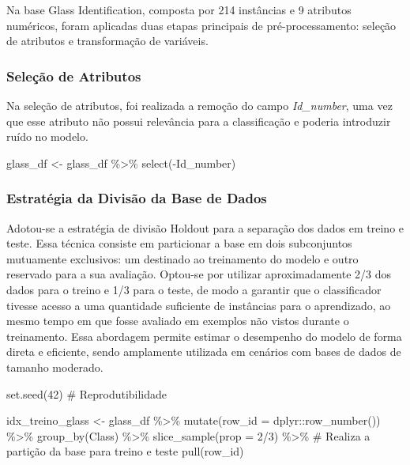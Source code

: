 \documentclass[
  letterpaper,
  DIV=11,
  numbers=noendperiod]{scrartcl}
\newenvironment{Shaded}{\begin{snugshade}}{\end{snugshade}}
\newcommand{\AttributeTok}[1]{\textcolor[rgb]{0.40,0.45,0.13}{#1}}
\newcommand{\CommentTok}[1]{\textcolor[rgb]{0.37,0.37,0.37}{#1}}
\newcommand{\DecValTok}[1]{\textcolor[rgb]{0.68,0.00,0.00}{#1}}
\newcommand{\FunctionTok}[1]{\textcolor[rgb]{0.28,0.35,0.67}{#1}}
\newcommand{\NormalTok}[1]{\textcolor[rgb]{0.00,0.23,0.31}{#1}}
\newcommand{\OtherTok}[1]{\textcolor[rgb]{0.00,0.23,0.31}{#1}}
\newcommand{\SpecialCharTok}[1]{\textcolor[rgb]{0.37,0.37,0.37}{#1}}
\begin{document}
Na base Glass Identification, composta por 214 instâncias e 9 atributos
numéricos, foram aplicadas duas etapas principais de pré-processamento:
seleção de atributos e transformação de variáveis.

\subsubsection{Seleção de Atributos}\label{seleuxe7uxe3o-de-atributos}

Na seleção de atributos, foi realizada a remoção do campo
\emph{Id\_number}, uma vez que esse atributo não possui relevância para
a classificação e poderia introduzir ruído no modelo.

\begin{Shaded}
\begin{Highlighting}[]
\NormalTok{glass\_df }\OtherTok{\textless{}{-}}\NormalTok{ glass\_df }\SpecialCharTok{\%\textgreater{}\%} 
  \FunctionTok{select}\NormalTok{(}\SpecialCharTok{{-}}\NormalTok{Id\_number)}
\end{Highlighting}
\end{Shaded}

\subsubsection{Estratégia da Divisão da Base de
Dados}\label{estratuxe9gia-da-divisuxe3o-da-base-de-dados}

Adotou-se a estratégia de divisão Holdout para a separação dos dados em
treino e teste. Essa técnica consiste em particionar a base em dois
subconjuntos mutuamente exclusivos: um destinado ao treinamento do
modelo e outro reservado para a sua avaliação. Optou-se por utilizar
aproximadamente 2/3 dos dados para o treino e 1/3 para o teste, de modo
a garantir que o classificador tivesse acesso a uma quantidade
suficiente de instâncias para o aprendizado, ao mesmo tempo em que fosse
avaliado em exemplos não vistos durante o treinamento. Essa abordagem
permite estimar o desempenho do modelo de forma direta e eficiente,
sendo amplamente utilizada em cenários com bases de dados de tamanho
moderado.

\begin{Shaded}
\begin{Highlighting}[]
\FunctionTok{set.seed}\NormalTok{(}\DecValTok{42}\NormalTok{)  }\CommentTok{\# Reprodutibilidade}

\NormalTok{idx\_treino\_glass }\OtherTok{\textless{}{-}}\NormalTok{ glass\_df }\SpecialCharTok{\%\textgreater{}\%}
  \FunctionTok{mutate}\NormalTok{(}\AttributeTok{row\_id =}\NormalTok{ dplyr}\SpecialCharTok{::}\FunctionTok{row\_number}\NormalTok{()) }\SpecialCharTok{\%\textgreater{}\%}
  \FunctionTok{group\_by}\NormalTok{(Class) }\SpecialCharTok{\%\textgreater{}\%}
  \FunctionTok{slice\_sample}\NormalTok{(}\AttributeTok{prop =} \DecValTok{2}\SpecialCharTok{/}\DecValTok{3}\NormalTok{) }\SpecialCharTok{\%\textgreater{}\%} \CommentTok{\# Realiza a partição da base para treino e teste}
  \FunctionTok{pull}\NormalTok{(row\_id)}
\end{Highlighting}
\end{Shaded}
\end{document}
